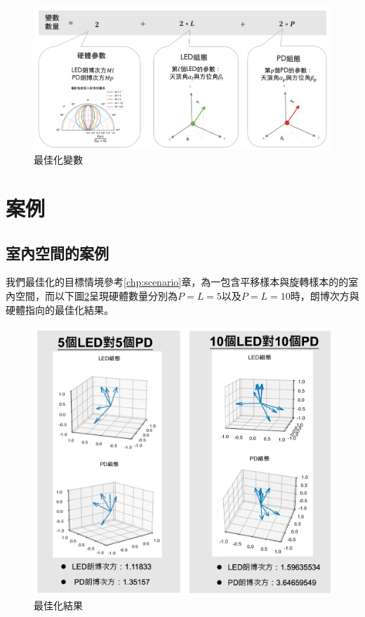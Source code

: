     \begin{figure}[h!]
        \centering
        \includegraphics[width=15cm]{ch5pic/optimize_variable.png}
        \caption{最佳化變數}
        \label{pic:optimize_variable}
    \end{figure}



\section{案例}
\label{chp:optimize_case}

    \subsection{室內空間的案例}

    我們最佳化的目標情境參考\ref{chp:scenario}章，為一包含平移樣本與旋轉樣本的的室內空間，而以下圖\ref{pic:opt_result}呈現硬體數量分別為$P=L=5$以及$P=L=10$時，朗博次方與硬體指向的最佳化結果。

    \begin{figure}[htpb]
        \centering
        \includegraphics[width=15cm]{ch5pic/opt_result.png}
        \caption{最佳化結果}
        \label{pic:opt_result}
    \end{figure}

